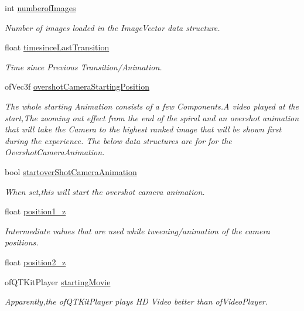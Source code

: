 \begin{DoxyCompactItemize}
int \hyperlink{classtest_app_a957cf7fdb3ea964a88ca1be13e4d68fc}{numberof\-Images}
\begin{DoxyCompactList}\small\item\em Number of images loaded in the Image\-Vector data structure. \end{DoxyCompactList}\item 
float \hyperlink{classtest_app_acb60fb8a89e9ec5d461630a20b11ceda}{timesince\-Last\-Transition}
\begin{DoxyCompactList}\small\item\em Time since Previous Transition/\-Animation. \end{DoxyCompactList}\item 
of\-Vec3f \hyperlink{classtest_app_a846feea7c2c4d4b1929bb72c546b3e19}{overshot\-Camera\-Starting\-Position}
\begin{DoxyCompactList}\small\item\em The whole starting Animation consists of a few Components.\-A video played at the start,The zooming out effect from the end of the spiral and an overshot animation that will take the Camera to the highest ranked image that will be shown first during the experience. The below data structures are for for the Overshot\-Camera\-Animation. \end{DoxyCompactList}\item 
bool \hyperlink{classtest_app_ad2fca6ce5e37462cd820afc48633324d}{startover\-Shot\-Camera\-Animation}
\begin{DoxyCompactList}\small\item\em When set,this will start the overshot camera animation. \end{DoxyCompactList}\item 
float \hyperlink{classtest_app_a808376783cdf510335cd1b37026e9bb3}{position1\-\_\-z}
\begin{DoxyCompactList}\small\item\em Intermediate values that are used while tweening/animation of the camera positions. \end{DoxyCompactList}\item 
float \hyperlink{classtest_app_a0720011cfaade6388109232ea4927c19}{position2\-\_\-z}
\item 
of\-Q\-T\-Kit\-Player \hyperlink{classtest_app_a9bfe7793fa0689a991ff64174745c38f}{starting\-Movie}
\begin{DoxyCompactList}\small\item\em Apparently,the of\-Q\-T\-Kit\-Player plays H\-D Video better than of\-Video\-Player. \end{DoxyCompactList}\item 

\end{DoxyCompactItemize}
